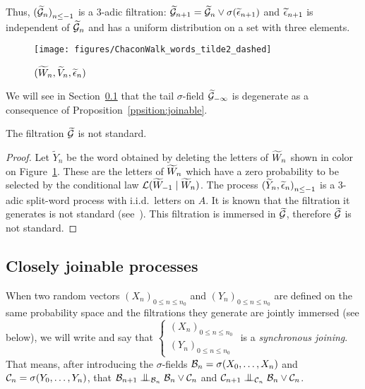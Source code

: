 \documentclass[12pt,a4paper]{article}
\begin{document}
Thus, ${(\widetilde{\mathcal{G}}_n)}_{n \leq -1}$ is a $3$-adic filtration: 
$\widetilde{\mathcal{G}}_{n+1} = \widetilde{\mathcal{G}}_n \vee \sigma(\widetilde{\epsilon}_{n+1})$ and 
$\widetilde{\epsilon}_{n+1}$ is independent of $\widetilde{\mathcal{G}}_n$ and has a uniform distribution 
on a set with three elements. 


\begin{figure}[!h]
\centering
	\texttt{[image: figures/ChaconWalk\_words\_tilde2\_dashed]}
\caption{$(\widetilde{W}_n, \widetilde{V}_n, \widetilde{\epsilon}_n)$}
\label{fig:tildeWn}
\end{figure}

We will see in Section~\ref{sec:joinable} that the tail $\sigma$-field 
$\widetilde{\mathcal{G}}_{-\infty}$ is degenerate as a consequence of Proposition~\ref{ppsition:joinable}.

\begin{ppsition}
The filtration $\widetilde{\mathcal{G}}$ is not standard. 
\end{ppsition}

\begin{proof}
Let $\widetilde{Y}_n$ be the word obtained by deleting the letters of $\widetilde{W}_n$ 
shown in color on Figure~\ref{fig:tildeWn}. 
These are the letters of $\widetilde{W}_n$ which have a zero probability to be selected 
by the conditional law ${\cal L}(\widetilde{W}_{-1} \mid \widetilde{W}_n)$. 
The process ${(\widetilde{Y}_n, \widetilde{\epsilon}_n)}_{n \leq -1}$ is a $3$-adic 
split-word process with i.i.d.\ letters on $A$. 
It is known that the filtration it generates is not standard 
(see~\cite{Ceil, LauXLIII, LauXLV}). 
This filtration is immersed in $\widetilde{\mathcal{G}}$, therefore $\widetilde{\mathcal{G}}$ is not standard.
\end{proof}


\subsection{Closely joinable processes}\label{sec:joinable}


When two random vectors 
${(X_n)}_{0 \leq n \leq n_0}$ and ${(Y_n)}_{0 \leq n \leq n_0}$ are defined 
on the same probability space and the filtrations they generate are 
jointly immersed (see below), we will write and say that 
$\left\{\begin{smallmatrix} {(X_n)}_{0 \leq n \leq n_0} \\ 
{(Y_n)}_{0 \leq n \leq n_0}
\end{smallmatrix}\right.$  is a \emph{synchronous joining}. 
That means, after introducing the $\sigma$-fields 
$\mathcal{B}_n = \sigma(X_{0}, \ldots, X_n)$ and  
$\mathcal{C}_n = \sigma(Y_{0}, \ldots, Y_n)$, that 
$\BB_{n+1} \indep_{\BB_n} \BB_n \vee \CC_n$ 
and $\CC_{n+1} \indep_{\CC_n} \BB_n \vee \CC_n$.  
\end{document}
